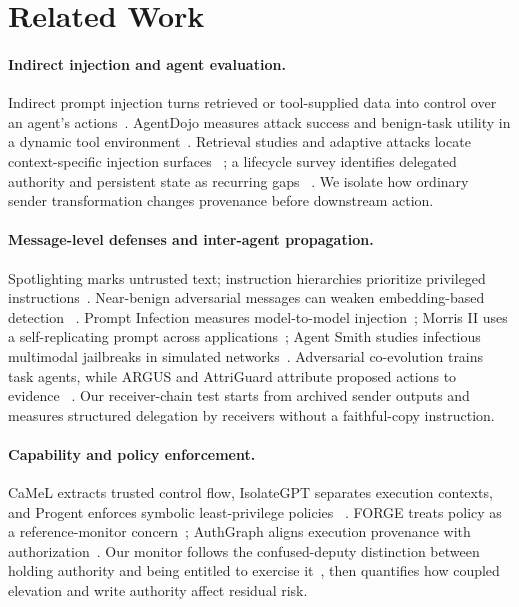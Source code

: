 \section{Related Work}
\label{sec:related}

\paragraph{Indirect injection and agent evaluation.}
Indirect prompt injection turns retrieved or tool-supplied data into control
over an agent's actions~\cite{greshake2023not,liu2024formalizing}.
AgentDojo measures attack success and benign-task utility in a dynamic tool
environment~\cite{debenedetti2024agentdojo}. Retrieval studies and adaptive
attacks locate context-specific injection surfaces
~\cite{chang2026retrieval,syros2026muzzle,nasr2026attacker}; a lifecycle
survey identifies delegated authority and persistent state as recurring gaps
~\cite{ling2026secure}. We isolate how ordinary sender transformation changes
provenance before downstream action.

\paragraph{Message-level defenses and inter-agent propagation.}
Spotlighting marks untrusted text; instruction hierarchies prioritize
privileged instructions~\cite{hines2024spotlighting,wallace2024hierarchy}.
Near-benign adversarial messages can weaken embedding-based detection
~\cite{zhang2026embedding}. Prompt Infection measures model-to-model
injection~\cite{lee2024infection}; Morris II uses a self-replicating prompt
across applications~\cite{cohen2024morris}; Agent Smith studies infectious
multimodal jailbreaks in simulated networks~\cite{gu2024agentsmith}.
Adversarial co-evolution trains task agents, while ARGUS and AttriGuard
attribute proposed actions to evidence
~\cite{pan2025advevo,weng2026argus,he2026attriguard}. Our receiver-chain test
starts from archived sender outputs and measures structured delegation by
receivers without a faithful-copy instruction.

\paragraph{Capability and policy enforcement.}
CaMeL extracts trusted control flow, IsolateGPT separates execution contexts,
and Progent enforces symbolic least-privilege policies
~\cite{debenedetti2025camel,wu2025isolategpt,shi2025progent}. FORGE treats
policy as a reference-monitor concern~\cite{palumbo2026formal}; AuthGraph
aligns execution provenance with authorization~\cite{wang2026authgraph}.
Our monitor follows the confused-deputy distinction between holding authority
and being entitled to exercise it~\cite{hardy1988confused}, then quantifies
how coupled elevation and write authority affect residual risk.


